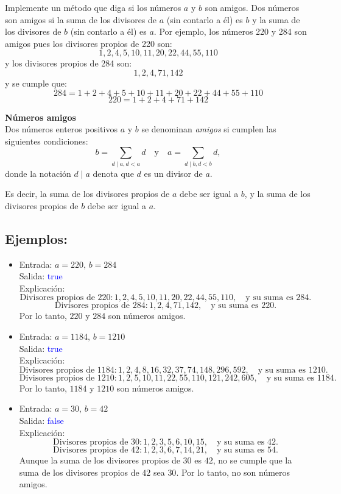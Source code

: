 Implemente un método que diga si los números $a$ y $b$ son amigos. Dos números son amigos si la suma de los divisores de $a$ (sin contarlo a él) es $b$ y la suma de los divisores de $b$ (sin contarlo a él) es $a$. Por ejemplo, los números 220 y 284 son amigos pues los divisores propios de 220 son:
\[
1, 2, 4, 5, 10, 11, 20, 22, 44, 55, 110
\]
y los divisores propios de 284 son:
\[
1, 2, 4, 71, 142
\]
y se cumple que:
\[
284 = 1 + 2 + 4 + 5 + 10 + 11 + 20 + 22 + 44 + 55 + 110
\]
\[
220 = 1 + 2 + 4 + 71 + 142
\]

\item \textbf{Números amigos}\\
Dos números enteros positivos \( a \) y \( b \) se denominan \textit{amigos} si cumplen las siguientes condiciones:
\[
b = \sum_{d \mid a, d < a}d \quad \text{y} \quad a = \sum_{d \mid b, d < b} d,
\]
donde la notación \( d \mid a \) denota que \( d \) es un divisor de \( a \). 

Es decir, la suma de los divisores propios de \( a \) debe ser igual a \( b \), y la suma de los divisores propios de \( b \) debe ser igual a \( a \).

\subsection*{Ejemplos:}
\begin{itemize}
    \item Entrada: \( a = 220, \, b = 284 \)\\
    Salida: \textcolor{blue}{true}\\
    Explicación:
    \[
    \text{Divisores propios de } 220: 1, 2, 4, 5, 10, 11, 20, 22, 44, 55, 110, \quad \text{y su suma es } 284.
    \]
    \[
    \text{Divisores propios de } 284: 1, 2, 4, 71, 142, \quad \text{y su suma es } 220.
    \]
    Por lo tanto, \( 220 \) y \( 284 \) son números amigos.

    \item Entrada: \( a = 1184, \, b = 1210 \)\\
    Salida: \textcolor{blue}{true}\\
    Explicación:
    \[
    \text{Divisores propios de } 1184: 1, 2, 4, 8, 16, 32, 37, 74, 148, 296, 592, \quad \text{y su suma es } 1210.
    \]
    \[
    \text{Divisores propios de } 1210: 1, 2, 5, 10, 11, 22, 55, 110, 121, 242, 605, \quad \text{y su suma es } 1184.
    \]
    Por lo tanto, \( 1184 \) y \( 1210 \) son números amigos.

    \item Entrada: \( a = 30, \, b = 42 \)\\
    Salida: \textcolor{blue}{false}\\
    Explicación:
    \[
    \text{Divisores propios de } 30: 1, 2, 3, 5, 6, 10, 15, \quad \text{y su suma es } 42.
    \]
    \[
    \text{Divisores propios de } 42: 1, 2, 3, 6, 7, 14, 21, \quad \text{y su suma es } 54.
    \]
    Aunque la suma de los divisores propios de \( 30 \) es \( 42 \), no se cumple que la suma de los divisores propios de \( 42 \) sea \( 30 \). Por lo tanto, no son números amigos.
\end{itemize}
